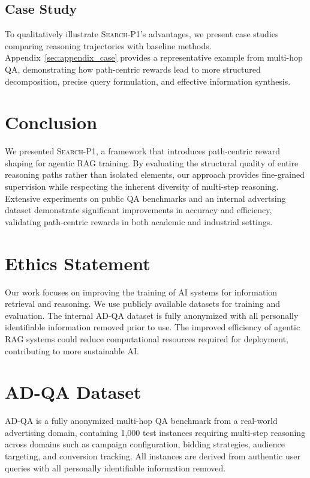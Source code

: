 \documentclass[11pt]{article}
\newcommand{\method}{\textsc{Search-P1}\xspace}
\begin{document}
\subsection{Case Study}
\label{sec:case_study}


To qualitatively illustrate \method's advantages, we present case studies comparing reasoning trajectories with baseline methods. Appendix~\ref{sec:appendix_case} provides a representative example from multi-hop QA, demonstrating how path-centric rewards lead to more structured decomposition, precise query formulation, and effective information synthesis.

\section{Conclusion}
\label{sec:conclusion}

We presented \method, a framework that introduces path-centric reward shaping for agentic RAG training.
By evaluating the structural quality of entire reasoning paths rather than isolated elements, our approach provides fine-grained supervision while respecting the inherent diversity of multi-step reasoning.
Extensive experiments on public QA benchmarks and an internal advertsing dataset demonstrate significant improvements in accuracy and efficiency, validating path-centric rewards in both academic and industrial settings.

\clearpage

\section*{Ethics Statement}

Our work focuses on improving the training of AI systems for information retrieval and reasoning.
We use publicly available datasets for training and evaluation. The internal AD-QA dataset is fully anonymized with all personally identifiable information removed prior to use.
The improved efficiency of agentic RAG systems could reduce computational resources required for deployment, contributing to more sustainable AI.



\clearpage
\appendix

\section{AD-QA Dataset}
\label{sec:appendix_adqa}

AD-QA is a fully anonymized multi-hop QA benchmark from a real-world advertising domain, containing 1,000 test instances requiring multi-step reasoning across domains such as campaign configuration, bidding strategies, audience targeting, and conversion tracking. All instances are derived from authentic user queries with all personally identifiable information removed.
\end{document}
